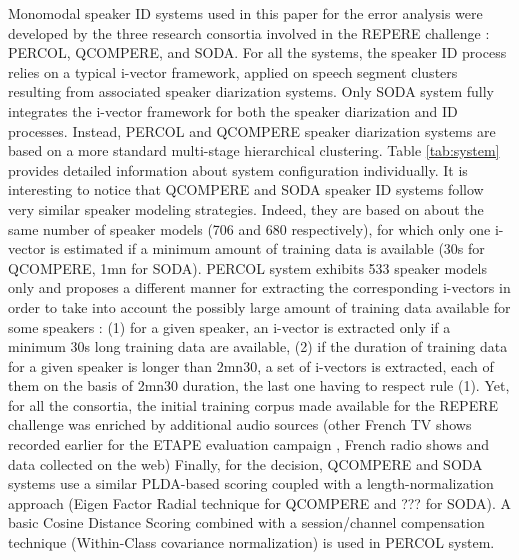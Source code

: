 Monomodal speaker ID systems used in this paper for the error analysis were developed by the three research consortia involved in the REPERE challenge : PERCOL, QCOMPERE, and SODA. For all the systems, the speaker ID process relies on a typical i-vector framework, applied on speech segment clusters resulting from associated speaker diarization systems. Only SODA system  \cite{dupuy2014}  fully integrates the i-vector framework for both the speaker diarization and ID processes. Instead, PERCOL and QCOMPERE speaker diarization systems \cite{Barras2006,charlet2013} are based on a more standard multi-stage hierarchical clustering. Table \ref{tab:system} provides detailed information about system configuration individually. It is interesting to notice that QCOMPERE and SODA speaker ID systems follow very similar speaker modeling strategies. Indeed, they are based on about the same number of speaker models (706 and 680 respectively), for which only one i-vector is estimated if a minimum amount of training data is available (30s for QCOMPERE, 1mn for SODA).  PERCOL system exhibits 533 speaker models only and proposes a different manner for extracting the corresponding i-vectors in order to take into account the possibly large amount of training data available for some speakers :  (1) for a given speaker, an i-vector is extracted only if a minimum 30s long training data are available, (2) if the duration of training data for a given speaker is longer than 2mn30, a set of i-vectors is extracted, each of them on the basis of 2mn30 duration, the last one having to respect rule (1). Yet, for all the consortia, the initial training corpus made available for the REPERE challenge was enriched by additional audio sources (other French TV shows recorded earlier for the ETAPE evaluation campaign \cite{gravier2012}, French radio shows and data collected on the web)  
Finally, for the decision, QCOMPERE and SODA systems use a similar PLDA-based scoring coupled with a length-normalization approach (Eigen Factor Radial technique for QCOMPERE and ??? for SODA). A basic Cosine Distance Scoring combined with a session/channel compensation technique (Within-Class covariance normalization)  is used in PERCOL system.


